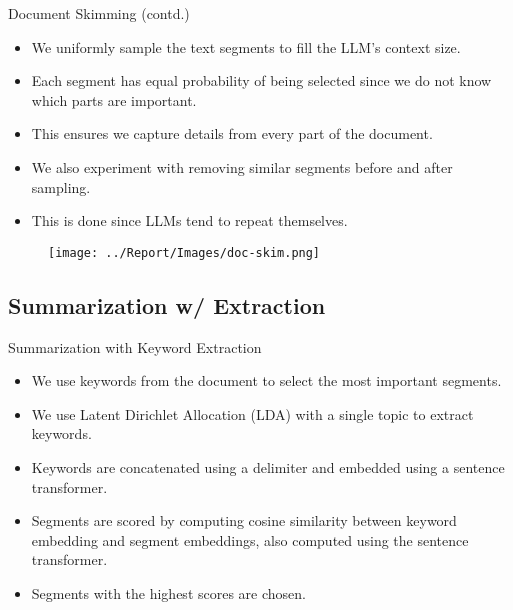 		\begin{frame}{Document Skimming (contd.)}

			\begin{itemize}
				\item We uniformly sample the text segments to fill the LLM's context size.
				\item Each segment has equal probability of being selected since we do not know
				which parts are important.
				\item This ensures we capture details from every part of the document.
				\item We also experiment with removing similar segments before and after sampling.
				\item This is done since LLMs tend to repeat themselves.
			\end{itemize}

			\begin{figure}
				\centering
				\texttt{[image: ../Report/Images/doc-skim.png]}
			\end{figure}

		\end{frame}


	\subsection{Summarization w/ Extraction}

		\begin{frame}{Summarization with Keyword Extraction}

			\begin{itemize}
				\item We use keywords from the document to select the most important segments.
				\item We use Latent Dirichlet Allocation (LDA) \citep{blei2003latent} with
				a single topic to extract keywords.
				\item Keywords are concatenated using a delimiter and embedded using a
				sentence transformer.
				\item Segments are scored by computing cosine similarity between keyword embedding
				and segment embeddings, also computed using the sentence transformer.
				\item Segments with the highest scores are chosen.
			\end{itemize}

		\end{frame}

